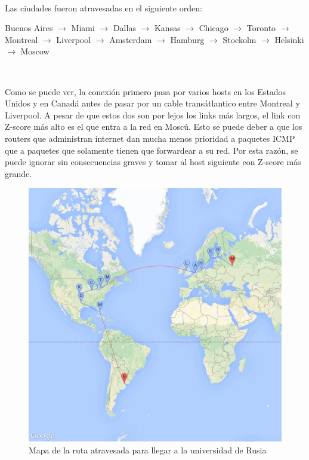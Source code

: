 ~

Las ciudades fueron atravesadas en el siguiente orden:

Buenos Aires $\rightarrow$ Miami $\rightarrow$ Dallas $\rightarrow$ Kansas $\rightarrow$ Chicago
$\rightarrow$ Toronto $\rightarrow$ Montreal $\rightarrow$ Liverpool $\rightarrow$ Amsterdam
$\rightarrow$ Hamburg $\rightarrow$ Stockolm $\rightarrow$ Helsinki $\rightarrow$ Moscow

~

Como se puede ver, la conexi\'on primero pasa por varios hosts en los Estados Unidos y en Canad\'a antes de
pasar por un cable trans\'atlantico entre Montreal y Liverpool. A pesar de que estos dos son por lejos
los links m\'as largos, el link con Z-score m\'as alto es el que entra a la red en Mosc\'u. Esto se puede
deber a que los routers que administran internet dan mucha menos prioridad a paquetes ICMP que a paquetes que
solamente tienen que forwardear a su red. Por esta raz\'on, se puede ignorar sin consecuencias graves y tomar
al host siguiente con Z-score m\'as grande.

\begin{figure}[H]
	\begin{center}
		  \includegraphics[scale=0.2]{../results/maps/MSU.png}
		  \caption{Mapa de la ruta atravesada para llegar a la universidad de Rusia}
	\end{center}
\end{figure}

